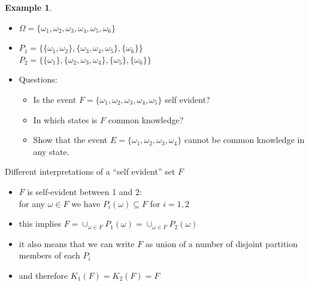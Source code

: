 \documentclass{beamer}    %
\newcommand{\Ra}{\Rightarrow}
\theoremstyle{plain}
\theoremstyle{definition}
\newtheorem{ex}{Example}
\begin{document}
{\begin{ex}
  \begin{itemize}
  \item
    $\Omega=\{\omega_1,\omega_2,\omega_3,\omega_4,\omega_5,\omega_6\}$
  \item $P_1=\{\{\omega_1,\omega_2\},\{\omega_3,\omega_4,\omega_5\},\{\omega_6\}\}$\\
    $P_2=\{\{\omega_1\},\{\omega_2,\omega_3,\omega_4\},\{\omega_5\},\{\omega_6\}\}$
\item Questions:    
\begin{itemize}
    \item Is the event
      $F=\{\omega_1,\omega_2,\omega_3,\omega_4,\omega_5\}$ self
      evident?
    \item In which states is $F$ common knowledge?
    \item Show that the event
      $E=\{\omega_1,\omega_2,\omega_3,\omega_4\}$ cannot be common
      knowledge in any state.
    \end{itemize}

  \end{itemize}
\end{ex}


\framebreak

Different interpretations of a ``self evident'' set $F$
\begin{itemize}
\item $F$ is self-evident between 1 and 2: \\
for any $\omega\in F$ we have $P_i(\omega)\subseteq F$ for $i=1,2$
\item this implies  $F=\cup_{\omega\in F}P_1(\omega)=\cup_{\omega\in F}P_2(\omega)$
\item it also means that we can write $F$ as union of a number of disjoint partition members of each $P_i$
\item and therefore $K_1(F)=K_2(F)=F$
\end{itemize}

}
\end{document}
